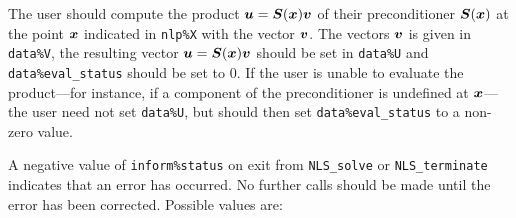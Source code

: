 \documentclass{galahad}
\newcommand{\packagename}{NLS}
\begin{document}
\begin{description}
 The user should compute the product ${\bm{u}} = {\bm{S}}({\bm{x}}){\bm{v}}$
     of their preconditioner ${\bm{S}}({\bm{x}})$ at the point ${\bm{x}}$
     indicated in {\tt nlp\%X} with the vector ${\bm{v}}$.
     The vectors ${\bm{v}}$ is given in {\tt data\%V}, the
     resulting vector ${\bm{u}} = {\bm{S}}({\bm{x}}){\bm{v}}$ should be set in {\tt data\%U}
     and {\tt data\%eval\_status}
     should be set to 0. If the user is unable to evaluate the product---for
     instance, if a component of the preconditioner is undefined at
     ${\bm{x}}$---the user need not set {\tt data\%U}, but should then set
     {\tt data\%eval\_status} to a non-zero value.
\end{description}



\galerrors
A negative value of {\tt inform\%status} on exit from
{\tt \packagename\_solve}
or
{\tt \packagename\_terminate}
indicates that an error has occurred. No further calls should be made
until the error has been corrected. Possible values are:
\end{document}

